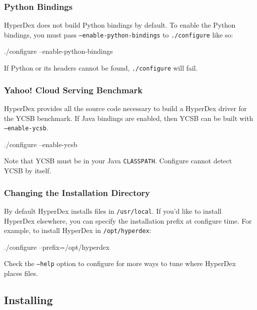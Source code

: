 \subsubsection{Python Bindings}
\label{sec:installation:source:python}

HyperDex does not build Python bindings by default.  To enable the Python
bindings, you must pass \texttt{--enable-python-bindings} to
\texttt{./configure} like so:

\begin{consolecode}
./configure --enable-python-bindings
\end{consolecode}

If Python or its headers cannot be found, \texttt{./configure} will fail.

\subsubsection{Yahoo! Cloud Serving Benchmark}
\label{sec:installation:source:ycsb}

HyperDex provides all the source code necessary to build a HyperDex driver
for the YCSB benchmark.  If Java bindings are enabled, then YCSB can be built
with \texttt{--enable-ycsb}.

\begin{consolecode}
./configure --enable-ycsb
\end{consolecode}

Note that YCSB must be in your Java \texttt{CLASSPATH}.  Configure cannot detect
YCSB by itself.

\subsubsection{Changing the Installation Directory}
\label{sec:installation:source:prefix}

By default HyperDex installs files in \texttt{/usr/local}.  If you'd like to
install HyperDex elsewhere, you can specify the installation prefix at configure
time.  For example, to install HyperDex in \texttt{/opt/hyperdex}:

\begin{consolecode}
./configure --prefix=/opt/hyperdex
\end{consolecode}

Check the \texttt{--help} option to configure for more ways to tune where
HyperDex places files.

\subsection{Installing}
\label{sec:installation:source:make}


